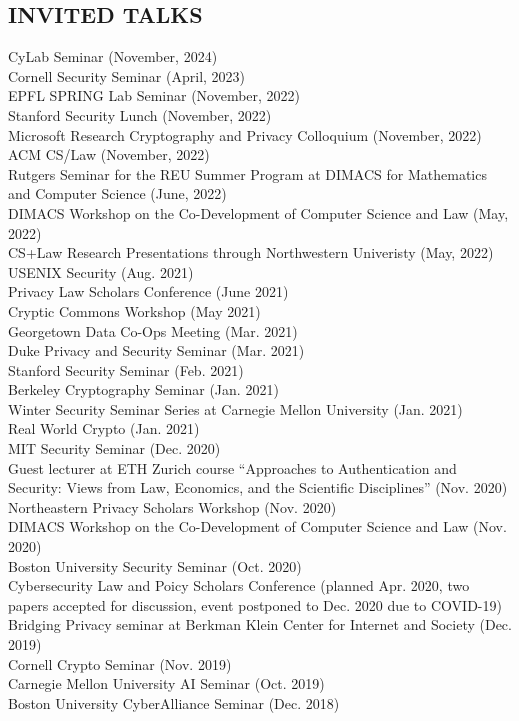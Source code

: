 \documentclass{res}
\begin{document}
\begin{resume}
\section{INVITED TALKS}
\vspace{0.1in}
CyLab Seminar (November, 2024) \\
Cornell Security Seminar (April, 2023) \\
EPFL SPRING Lab Seminar (November, 2022) \\
Stanford Security Lunch (November, 2022) \\
Microsoft Research Cryptography and Privacy Colloquium (November, 2022) \\
ACM CS/Law (November, 2022) \\
Rutgers Seminar for the REU Summer Program at DIMACS for Mathematics and Computer Science (June, 2022) \\
DIMACS Workshop on the Co-Development of Computer Science and Law (May, 2022) \\
CS+Law Research Presentations through Northwestern Univeristy (May, 2022) \\
USENIX Security (Aug. 2021) \\
Privacy Law Scholars Conference (June 2021) \\
Cryptic Commons Workshop (May 2021) \\
Georgetown Data Co-Ops Meeting (Mar. 2021) \\
Duke Privacy and Security Seminar (Mar. 2021) \\
Stanford Security Seminar (Feb. 2021) \\
Berkeley Cryptography Seminar (Jan. 2021) \\
Winter Security Seminar Series at Carnegie Mellon University (Jan. 2021) \\
Real World Crypto (Jan. 2021) \\
MIT Security Seminar (Dec. 2020) \\
Guest lecturer at ETH Zurich course ``Approaches to Authentication and Security: Views from Law,
Economics, and the Scientific Disciplines'' (Nov. 2020) \\
Northeastern Privacy Scholars Workshop (Nov. 2020) \\
DIMACS Workshop on the Co-Development of Computer Science and Law (Nov. 2020) \\
Boston University Security Seminar (Oct. 2020) \\
Cybersecurity Law and Poicy Scholars Conference (planned Apr. 2020, two papers accepted for
discussion, event postponed to Dec. 2020 due to COVID-19) \\
Bridging Privacy seminar at Berkman Klein Center for Internet and Society (Dec. 2019) \\ 
Cornell Crypto Seminar (Nov. 2019) \\
Carnegie Mellon University AI Seminar (Oct. 2019) \\
Boston University CyberAlliance Seminar (Dec. 2018)


\end{resume}
\end{document}
